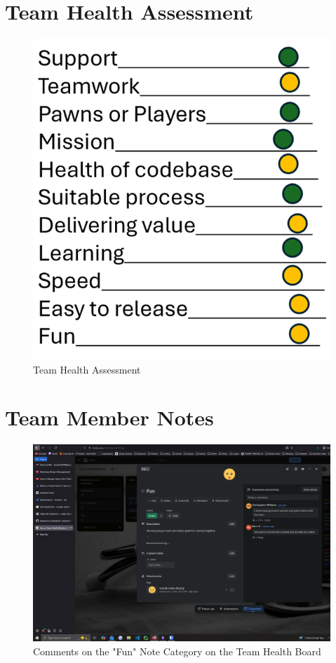 \documentclass[12pt]{article}
\begin{document}
\section{Team Health Assessment}

\begin{figure}[H]
    \centering
    \includegraphics[width=0.75\linewidth]{images/team_health_assessment_q6.png}
    \caption{Team Health Assessment}
    \label{fig:q6}
\end{figure}

\section{Team Member Notes}

\begin{figure}[H]
    \centering
    \includegraphics[width=0.75\linewidth]{images/trello_note_q7.png}
    \caption{Comments on the "Fun" Note Category on the Team Health Board}
    \label{fig:q7}
\end{figure}
\end{document}

